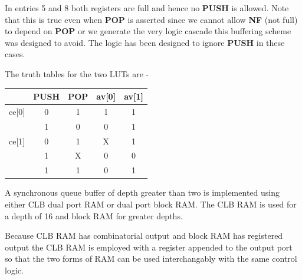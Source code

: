 \documentclass[10pt,a4paper,twoside,fleqn]{book}
\begin{document}
                    In entries 5 and 8 both registers are full and hence no {\bf
                    PUSH} is allowed. Note that this is true even when {\bf POP}
                    is asserted since we cannot allow {\bf NF} (not full) to
                    depend on {\bf POP} or we generate the very logic cascade
                    this buffering scheme was designed to avoid. The logic has
                    been designed to ignore {\bf PUSH} in these cases.

                    The truth tables for the two LUTs are -

                    \begin{tabular}{ l || c | c | c | c |}
                    & PUSH & POP & av[0] & av[1]  \\
                    \hline
                    ce[0] & 0 & 1 & 1 & 1 \\
                          & 1 & 0 & 0 & 1 \\
                    \hline
                    ce[1] & 0 & 1 & X & 1 \\
                          & 1 & X & 0 & 0 \\
                          & 1 & 1 & 0 & 1 \\
                    \hline
                    \end{tabular}



                    A synchronous queue buffer of depth greater than two is
                    implemented using either CLB dual port RAM or dual port
                    block RAM. The CLB RAM is used for a depth of 16 and block
                    RAM for greater depths.
                    
                    Because CLB RAM has combinatorial output and block RAM
                    has registered output the CLB RAM is employed with a
                    register appended to the output port so that the two
                    forms of RAM can be used interchangably with the same
                    control logic.
                    
\end{document}
